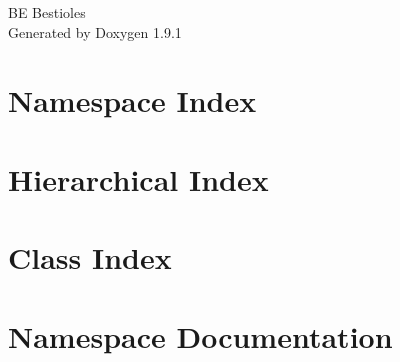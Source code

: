 \let\mypdfximage\pdfximage\def\pdfximage{\immediate\mypdfximage}\documentclass[twoside]{book}
\newcommand{\+}{\discretionary{\mbox{\scriptsize$\hookleftarrow$}}{}{}}
\newcommand{\clearemptydoublepage}{%
  \newpage{\pagestyle{empty}\cleardoublepage}%
}
\begin{document}
\raggedbottom

\hypersetup{pageanchor=false,
             bookmarksnumbered=true,
             pdfencoding=unicode
            }
\begin{titlepage}
\vspace*{7cm}
\begin{center}%
{\Large BE Bestioles }\\
\vspace*{1cm}
{\large Generated by Doxygen 1.9.1}\\
\end{center}
\end{titlepage}
\clearemptydoublepage
{}
\tableofcontents
\clearemptydoublepage
{}
\hypersetup{pageanchor=true}

\chapter{Namespace Index}

\chapter{Hierarchical Index}

\chapter{Class Index}

\chapter{Namespace Documentation}


\end{document}
